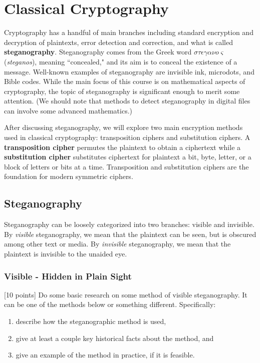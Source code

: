 \chapter{Classical Cryptography}
\label{ch:classical}

   Cryptography  has a handful of main branches including standard encryption and decryption of plaintexts, error detection and correction, and what is called {\bf steganography}. Steganography comes from the Greek word $\sigma\tau\epsilon\gamma\alpha\nu o \varsigma$ ({\em steganos}), meaning ``concealed," and its aim is to conceal the existence of a message. Well-known examples of steganography are invisible ink, microdots, and Bible codes. While the main focus of this course is on mathematical aspects of cryptography, the topic of steganography is significant enough to merit some attention. (We should note that methods to detect steganography in digital files can involve some advanced mathematics.)

   After discussing steganography, we will explore two main encryption methods used in classical cryptography: transposition ciphers  and substitution ciphers.  A {\bf transposition cipher} permutes the plaintext to obtain a ciphertext while a {\bf substitution cipher} substitutes ciphertext for plaintext a bit, byte, letter, or a block of letters or bits at a time. Transposition and substitution ciphers are the foundation for modern symmetric ciphers.

	\section{Steganography}

        Steganography can be loosely categorized into two branches: visible and invisible. By {\em visible} steganography, we mean that the plaintext can be seen, but is obscured among other text or media. By {\em invisible} steganography, we mean that the plaintext is invisible to the unaided eye.

		\subsection{Visible - Hidden in Plain Sight}

\begin{problem}
\label{prob-steg1} [10 points]
Do some basic research on some method of visible steganography. It can be one of the methods below or something different. Specifically:
\begin{enumerate}
   \item describe how the steganographic method is used,
   \item give at least a couple key historical facts about the method, and
   \item give an example of the method in practice, if it is feasible.
\end{enumerate}
\end{problem}


